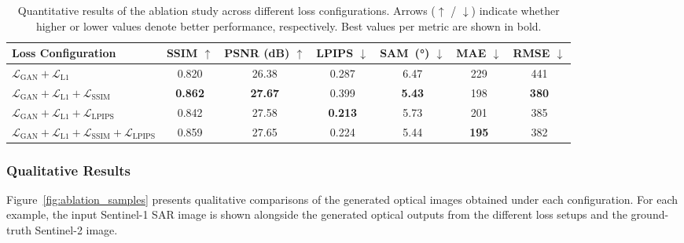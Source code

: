 \begin{table}[h!]
\centering
\caption{Quantitative results of the ablation study across different loss configurations. Arrows ($\uparrow$ / $\downarrow$) indicate whether higher or lower values denote better performance, respectively. 
Best values per metric are shown in bold.}
\label{tab:ablation_quantitative}
\begin{tabular}{lcccccc}
\toprule
\textbf{Loss Configuration} & \textbf{SSIM $\uparrow$} & \textbf{PSNR (dB) $\uparrow$} & \textbf{LPIPS $\downarrow$} & \textbf{SAM~(°) $\downarrow$} & \textbf{MAE $\downarrow$} & \textbf{RMSE $\downarrow$} \\
\midrule
$\mathcal{L}_{\text{GAN}} + \mathcal{L}_{\text{L1}}$ & 0.820 & 26.38 & 0.287 & 6.47 & 229 & 441 \\
$\mathcal{L}_{\text{GAN}} + \mathcal{L}_{\text{L1}} + \mathcal{L}_{\text{SSIM}}$ & \textbf{0.862} & \textbf{27.67} & 0.399 & \textbf{5.43} & 198 & \textbf{380} \\
$\mathcal{L}_{\text{GAN}} + \mathcal{L}_{\text{L1}} + \mathcal{L}_{\text{LPIPS}}$ & 0.842 & 27.58 & \textbf{0.213} & 5.73 & 201 & 385 \\
$\mathcal{L}_{\text{GAN}} + \mathcal{L}_{\text{L1}} + \mathcal{L}_{\text{SSIM}} + \mathcal{L}_{\text{LPIPS}}$ & 0.859 & 27.65 & 0.224 & 5.44 & \textbf{195} & 382 \\
\bottomrule
\end{tabular}
\end{table}


\subsubsection*{Qualitative Results}
Figure~\ref{fig:ablation_samples} presents qualitative comparisons of the generated optical images obtained under each configuration. 
For each example, the input Sentinel-1 SAR image is shown alongside the generated optical outputs from the different loss setups and the ground-truth Sentinel-2 image.

